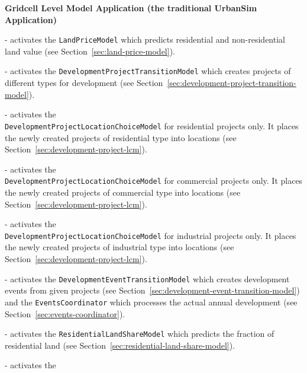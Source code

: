 \bf{Gridcell Level Model Application (the traditional UrbanSim Application)}
\begin{description}
  \tight
  \item[``land_price_model''] \modelsindex - activates the \verb|LandPriceModel| \modelsindex which
  predicts residential and non-residential land value (see
  Section~\ref{sec:land-price-model}).
  \item[``development_project_transition_model''] \modelsindex - activates the
  \verb|DevelopmentProjectTransitionModel| \modelsindex which creates projects of different
  types for development (see
  Section~\ref{sec:development-project-transition-model}).
  \item[``residential_development_project_location_choice_model''] \modelsindex - activates
  the \\ \verb|DevelopmentProjectLocationChoiceModel| \modelsindex for residential projects
  only. It places the newly created projects of residential type into locations
  (see Section~\ref{sec:development-project-lcm}).
  \item[``commercial_development_project_location_choice_model''] \modelsindex - activates
  the \\ \verb|DevelopmentProjectLocationChoiceModel| \modelsindex for commercial projects
  only. It places the newly created projects of commercial type into locations
  (see Section~\ref{sec:development-project-lcm}).
  \item[``industrial_development_project_location_choice_model''] \modelsindex - activates
  the \\ \verb|DevelopmentProjectLocationChoiceModel| \modelsindex for industrial projects
  only. It places the newly created projects of industrial type into locations
  (see Section~\ref{sec:development-project-lcm}).
  \item[``development_event_transition_model''] \modelsindex - activates the
  \verb|DevelopmentEventTransitionModel| \modelsindex which creates development events from
  given projects (see Section~\ref{sec:development-event-transition-model}) and
  the \verb|EventsCoordinator| which processes the actual annual development
  (see Section~\ref{sec:events-coordinator}).
  \item[``residential_land_share_model''] \modelsindex - activates the
  \verb|ResidentialLandShareModel| \modelsindex which predicts the fraction of residential
  land (see Section~\ref{sec:residential-land-share-model}).
  \item[``household_transition_model''] \modelsindex - activates the

\end{description}
